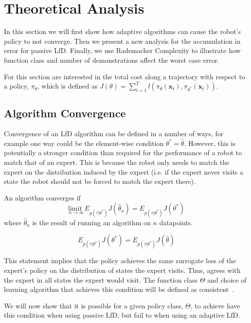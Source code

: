 \documentclass[10pt, conference]{ieeeconf}      %
\newcommand{\bx}{\mathbf{x}}
\begin{document}
 

\section{Theoretical Analysis}
In this section we will first show how adaptive algorithms can cause the robot's policy to not converge. Then we present a new analysis for the accumulation in error for  passive LfD.  Finally, we use Rademacher Complexity to illustrate how function class and number of demonstrations affect the worst case error. 

For this section are interested in the total cost along a trajectory with respect to a policy, $\pi_{\theta}$, which is defined as $J(\theta) = \sum^T_{t=1} l(\pi_{\theta}(\bx_{t}),\pi_{\theta^*}(\bx_{t}))$. 

\subsection{Algorithm Convergence}

Convergence of an LfD algorithm can be defined in a number of ways, for example one way could be the element-wise condition $\theta^* = \hat{\theta}$. However, this is potentially a stronger condition than required for the performance of a robot to match that of an expert.  This is because the robot only needs to match the expert on the distribution induced by the expert (i.e. if the expert never visits a state the robot should not be forced to match the expert there). 

An algorithm converges if
$$\underset{n \rightarrow \infty}{\text{limit }} E_{p(\tau|\theta^*)}J(\hat{\theta}_n)  = E_{p(\tau|\theta^*)}J(\theta^*) $$
\noindent where $\hat{\theta}_n$ is the result of running an algorithm on $n$ datapoints.

$$E_{p(\tau|\theta^*)}J(\theta^*) = E_{p(\tau|\theta^*)}J(\hat{\theta}) $$

This statement implies that the policy achieves the same surrogate loss of the expert's policy on the distribution of states the expert visits. Thus, agrees with the expert in all states the expert would visit.  The function class $\Theta$ and choice of learning algorithm that achieves this condition will be defined as consistent~\cite{vapnik1992principles}.


We will now show that it is possible for a given policy class, $\Theta$, to achieve have this condition when using passive LfD, but fail to when using an adaptive LfD. \\
\end{document}
